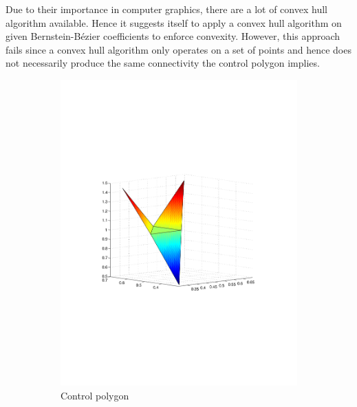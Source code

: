 Due to their importance in computer graphics, there are a lot of convex hull algorithm available. Hence it suggests itself to apply a convex hull algorithm on given Bernstein-B\'ezier coefficients to enforce convexity. However, this approach fails since a convex hull algorithm only operates on a set of points and hence does not necessarily produce the same connectivity the control polygon implies. 
\begin{figure}[h]
\begin{subfigure}[b]{.5\textwidth}
	\includegraphics[trim=3cm 8cm 3cm 8cm, width=1.\textwidth]{control_polygon2.pdf}
	\caption{Control polygon}
\end{subfigure}
\begin{subfigure}[b]{.5\textwidth}

\end{subfigure}
\end{figure}
